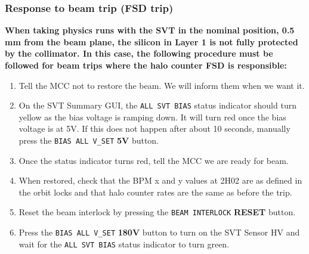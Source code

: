 \documentclass[12pt]{report}
\begin{document}
\subsubsection{Response to beam trip (FSD trip)}
\label{sec:proc_fsd_beamtrip}

\textbf{When taking physics runs with the SVT in  the nominal position, 0.5 mm from the beam plane, the silicon in Layer 1 is not fully protected by the collimator.  In this case, the following procedure must be followed for beam trips where the halo counter FSD is responsible:}
\begin{enumerate}
\item Tell the MCC not to restore the beam. We will inform them when we want it.
\item On the SVT Summary GUI, the \texttt{ALL SVT BIAS} status indicator should turn yellow as the bias voltage is ramping down. It will turn red once the bias voltage is at 5V. If this does not happen after about 10 seconds, manually press the \texttt{BIAS ALL V\_SET} \textbf{5V} button.
\item Once the status indicator turns red, tell the MCC we are ready for beam.
\item When restored, check that the BPM x and y values at 2H02 are as defined in the orbit locks and that halo counter rates are the same as before the trip.
\item Reset the beam interlock by pressing the \texttt{BEAM INTERLOCK} \textbf{RESET} button.
\item Press the \texttt{BIAS ALL V\_SET} \textbf{180V} button to turn on the SVT Sensor HV and wait for the \texttt{ALL SVT BIAS} status indicator to turn green.

\end{enumerate}
\end{document}
